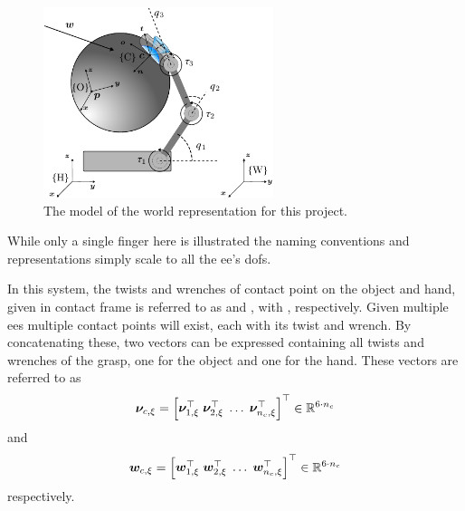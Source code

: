 \begin{figure}[h]
	\begin{small}
		\begin{center}
			\includegraphics[width=0.6\textwidth]{chapters/modeling/fig/sys-schematic.pdf}
		\end{center}
		\caption{The model of the world representation for this project.}
		\label{fig:full-system-model}
	\end{small}
\end{figure}


While only a single finger here is illustrated the naming conventions and representations simply scale to all the \gls{ee}'s \gls{dof}s.\medskip

In this system, the twists and wrenches of contact point  on the object and hand, given in contact frame  is referred to as  and , with , respectively. Given multiple \gls{ee}s multiple contact points will exist, each with its twist and wrench. By concatenating these, two vectors can be expressed containing all twists and wrenches of the grasp, one for the object and one for the hand. These vectors are referred to as 
%
\begin{equation}
	\vec{\nu}_{c,\xi} = \rvec{\vec{\nu}_{1,\xi}^\T \vsep \vec{\nu}_{2,\xi}^\T \vsep \ldots \vsep \vec{\nu}_{n_c,\xi}^\T}^\T \inR{6\cdot n_c}
	\label{eq:all-twists}
\end{equation}
%
and
\begin{equation}
	\vec{w}_{c,\xi} = \rvec{\vec{w}_{1,\xi}^\T \vsep \vec{w}_{2,\xi}^\T \vsep \ldots \vsep \vec{w}_{n_c,\xi}^\T}^\T \inR{6\cdot n_c}
	\label{eq:all-wrenches}
\end{equation}
%
respectively. \medskip

